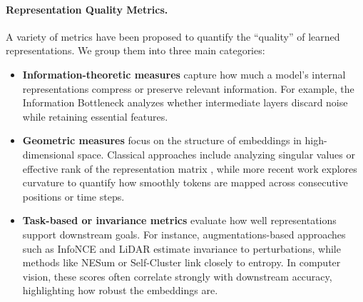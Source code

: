 
\paragraph{Representation Quality Metrics.}


A variety of metrics have been proposed to quantify the ``quality'' of learned representations. We group them into three main categories:

\begin{itemize}[itemsep=1pt, topsep=0pt]
    \item \textbf{Information-theoretic measures} capture how much a model's internal representations compress or preserve relevant information. For example, the Information Bottleneck \citep{shwartz2017opening, shwartz2022information} analyzes whether intermediate layers discard noise while retaining essential features.
    
    \item \textbf{Geometric measures} focus on the structure of embeddings in high-dimensional space. Classical approaches include analyzing singular values or effective rank of the representation matrix \citep{garrido2023rankme}, while more recent work explores curvature \citep{hosseini2024curvature} to quantify how smoothly tokens are mapped across consecutive positions or time steps.
    
    \item \textbf{Task-based or invariance metrics} evaluate how well representations support downstream goals. For instance, augmentations-based approaches such as InfoNCE \citep{oord2018representation} and LiDAR \citep{thilak2023lidar} estimate invariance to perturbations, while methods like NESum or Self-Cluster \citep{agrawal2022alphareq} link closely to entropy. In computer vision, these scores often correlate strongly with downstream accuracy, highlighting how robust the embeddings are.
\end{itemize}

